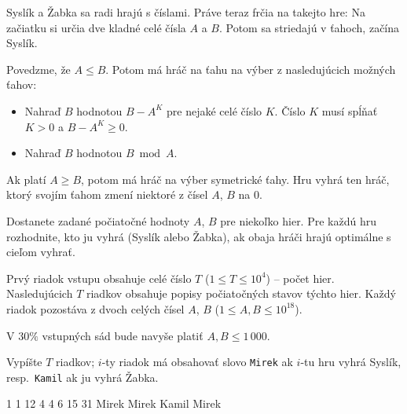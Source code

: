 






Syslík a Žabka sa radi hrajú s číslami. Práve teraz frčia na takejto hre: Na
začiatku si určia dve kladné celé čísla $A$ a $B$. Potom sa striedajú v ťahoch,
začína Syslík.

Povedzme, že $A \leq B$. Potom má hráč na ťahu na výber z nasledujúcich možných
ťahov:
\begin{itemize}
\item
Nahraď $B$ hodnotou $B - A^K$ pre nejaké celé číslo $K$. Číslo $K$ musí spĺňať
$K > 0$ a $B - A^K \geq 0$.
\item
Nahraď $B$ hodnotou $B \bmod A$.
\end{itemize}
Ak platí $A \geq B$, potom má hráč na výber symetrické ťahy. Hru vyhrá ten hráč,
ktorý svojím ťahom zmení niektoré z čísel $A$, $B$ na $0$.



Dostanete zadané počiatočné hodnoty $A$, $B$ pre niekoľko hier. Pre každú hru
rozhodnite, kto ju vyhrá (Syslík alebo Žabka), ak obaja hráči hrajú optimálne s
cieľom vyhrať.



Prvý riadok vstupu obsahuje celé číslo $T$ ($1 \leq T \leq 10^4$) -- počet hier.
Nasledujúcich $T$ riadkov obsahuje popisy počiatočných stavov týchto hier. Každý
riadok pozostáva z dvoch celých čísel $A$, $B$ ($1 \leq A, B \leq 10^{18}$).

V $30\%$ vstupných sád bude navyše platiť $A, B \leq 1\,000$.



Vypíšte $T$ riadkov; $i$-ty riadok má obsahovať slovo \texttt{Mirek} ak $i$-tu
hru vyhrá Syslík, resp.\ \texttt{Kamil} ak ju vyhrá Žabka.



1 1
12 4
4 6
15 31
\sampleOUT
Mirek
Mirek
Kamil
Mirek
\sampleEND


